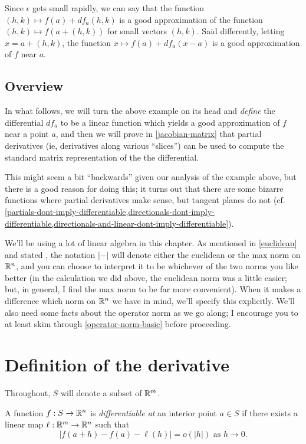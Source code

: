 Since $\epsilon$ gets small rapidly, we can say that the function $(h,k) \mapsto f(a) + df_a(h,k)$ is a good approximation of the function $(h,k) \mapsto f(a+(h,k))$ for small vectors $(h,k)$. Said differently, letting $x = a + (h,k)$, the function $x \mapsto f(a) + df_a(x-a)$ is a good approximation of $f$ near $a$. 

\subsection*{Overview}

In what follows, we will turn the above example on its head and \emph{define} the differential $df_a$ to be a linear function which yields a good approximation of $f$ near a point $a$, and then we will prove in \cref{jacobian-matrix} that partial derivatives (ie, derivatives along various ``slices'') can be used to compute the standard matrix representation of the the differential. 

This might seem a bit ``backwards'' given our analysis of the example above, but there is a good reason for doing this; it turns out that there are some bizarre functions where partial derivatives make sense, but tangent planes do not (cf. \cref{partials-dont-imply-differentiable,directionals-dont-imply-differentiable,directionals-and-linear-dont-imply-differentiable}).

We'll be using a lot of linear algebra in this chapter. As mentioned in \cref{euclidean} and stated , the notation $|-|$ will denote either the euclidean or the max norm on $\mathbb{R}^n$, and you can choose to interpret it to be whichever of the two norms you like better (in the calculation we did above, the euclidean norm was a little easier; but, in general, I find the max norm to be far more convenient). When it makes a difference which norm on $\mathbb{R}^n$ we have in mind, we'll specify this explicitly.  We'll also need some facts about the operator norm as we go along; I encourage you to at least skim through \cref{operator-norm-basic} before proceeding. 

\section{Definition of the derivative}

Throughout, $S$ will denote a subset of $\mathbb{R}^m$. 

\begin{definition} 
	A function $f : S \to \mathbb{R}^n$ is \emph{differentiable at} an interior point $a \in S$ if there exists a linear map $\ell : \mathbb{R}^m \to \mathbb{R}^n$ such that
	\[ |f(a+h)-f(a)-\ell(h)| = o(|h|) \text{ as } h \to 0. \]
\end{definition}

